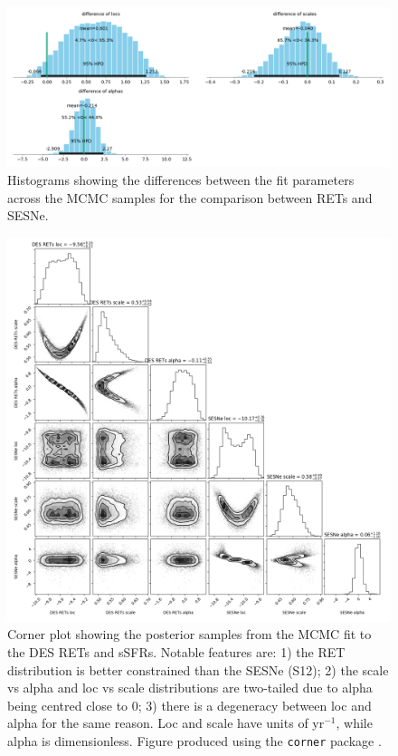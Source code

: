 \documentclass[fleqn,usenatbib,]{mnras}
\begin{document}
\begin{figure}
\includegraphics[width=\textwidth]{mc_figs/rets_s12_param_diffs_ssfr_final.png}
\caption{Histograms showing the differences between the fit parameters across the MCMC samples for the comparison between RETs and SESNe. 
\label{fig:param_diffs}}
\end{figure}

\begin{figure}
\includegraphics[width=\textwidth]{mc_figs/rets_s12_ssfr_corner_final.png}
\caption{Corner plot showing the posterior samples from the MCMC fit to the DES RETs and \citet{Sanders2012} sSFRs. Notable features are: 1) the RET distribution is better constrained than the SESNe (S12); 2) the scale vs alpha and loc vs scale distributions are two-tailed due to alpha being centred close to 0; 3) there is a degeneracy between loc and alpha for the same reason. Loc and scale have units of yr$^{-1}$, while alpha is dimensionless. Figure produced using the \texttt{corner} package \citep{Foreman-Mackey2016}.
\label{fig:corner}}
\end{figure}
\end{document}
